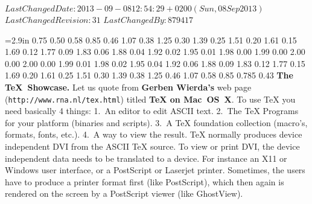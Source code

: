 %
{$LastChangedDate: 2013-09-08 12:54:29 +0200 (Sun, 08 Sep 2013) $}%
{$LastChangedRevision: 31 $}%
{$LastChangedBy: 879417 $}
\renewcommand\TheFile{ShowcaseCircular.tex}


\nopagenumbers {}=2.9in \parindent0pt
  0.75   0.50
  0.58   0.85
  0.46   1.07
  0.38   1.25
  0.30   1.39
  0.25   1.51
  0.20   1.61
  0.15   1.69
  0.12   1.77
  0.09   1.83
  0.06   1.88
  0.04   1.92
  0.02   1.95
  0.01   1.98
  0.00   1.99
  0.00   2.00
  0.00   2.00
  0.00   1.99
  0.01   1.98
  0.02   1.95
  0.04   1.92
  0.06   1.88
  0.09   1.83
  0.12   1.77
  0.15   1.69
  0.20   1.61
  0.25   1.51
  0.30   1.39
  0.38   1.25
  0.46   1.07
  0.58   0.85
  0.785   0.43
\baselineskip=12.5pt
\parfillskip=0pt
{\bf The \TeX\ Showcase.}
Let us quote from {\bf Gerben Wierda's} web page
({\tt http://www.rna.nl/tex.html}) titled
{\bf TeX on Mac~OS~X}.
To use TeX you need basically 4 things:
1.~An editor to edit ASCII text. 
2.~The TeX Programs for your platform (binaries and scripts). 
3.~A TeX foundation collection (macro's, formats, fonts, etc.). 
4.~A way to view the result.
%
TeX normally produces device independent DVI from the ASCII TeX source. 
To view or print DVI, the device independent data needs to be translated to a device. For instance an X11 or Windows user interface, or a PostScript or Laserjet printer. Sometimes, the users have to produce a printer format first (like PostScript), which then again is rendered on the screen by a PostScript viewer (like GhostView).
